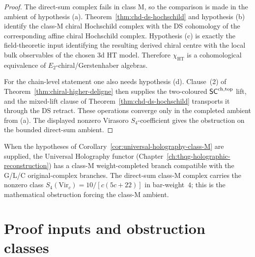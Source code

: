 \begin{proof}
The direct-sum complex fails in class M, so the comparison is made in
the ambient of hypothesis \textup{(a)}.  Theorem~\ref{thm:chd-ds-hochschild}
and hypothesis \textup{(b)} identify the class-M chiral Hochschild
complex with the DS cohomology of the corresponding affine chiral
Hochschild complex.  Hypothesis \textup{(c)} is exactly the
field-theoretic input identifying the resulting derived chiral centre
with the local bulk observables of the chosen 3d HT model.  Therefore
\(\chi_{\mathrm{HT}}\) is a cohomological equivalence of
\(E_2\)-chiral/Gerstenhaber algebras.

For the chain-level statement one also needs hypothesis
\textup{(d)}.  Clause~(2) of Theorem~\ref{thm:chiral-higher-deligne}
then supplies the two-coloured \(\mathsf{SC}^{\mathrm{ch},\mathrm{top}}\) lift, and the mixed-lift
clause of Theorem~\ref{thm:chd-ds-hochschild} transports it through
the DS retract.  These operations converge only in the completed
ambient from \textup{(a)}.  The displayed nonzero Virasoro
\(S_4\)-coefficient gives the obstruction on the bounded direct-sum
ambient.
\end{proof}

\begin{remark}%
\label{rem:chd-vol2-part-vi}%
When the hypotheses of Corollary~\ref{cor:universal-holography-class-M}
are supplied, the
Universal Holography functor
(Chapter~\ref{ch:thqg-holographic-reconstruction}) has a class-M
weight-completed branch compatible with the G/L/C original-complex
branches.  The
direct-sum class-M complex carries the nonzero class
$S_4(\mathrm{Vir}_c)=10/[c(5c+22)]$ in bar-weight~$4$; this is the
mathematical obstruction forcing the class-M ambient.
\end{remark}

\section{Proof inputs and obstruction classes}
\label{sec:chd-proof-inputs}

